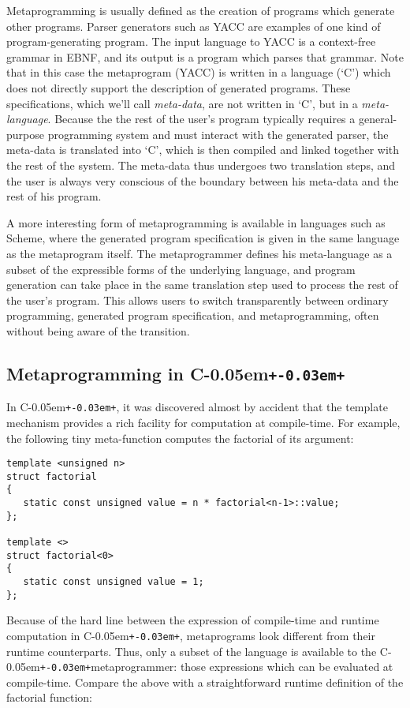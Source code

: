 \documentclass{netobjectdays}
\newcommand{\Cpp}{C\kern-0.05em\texttt{+\kern-0.03em+}}
\begin{document}
Metaprogramming is usually defined as the creation of programs which
generate other programs. Parser generators such as YACC are examples
of one kind of program-generating program. The input language to YACC
is a context-free grammar in EBNF, and its output is a program which
parses that grammar. Note that in this case the metaprogram (YACC) is
written in a language (`C') which does not directly support the
description of generated programs. These specifications, which we'll
call \emph{meta-data}, are not written in `C', but in a
\emph{meta-language}. Because the the rest of the user's program
typically requires a general-purpose programming system and must
interact with the generated parser, the meta-data is translated into
`C', which is then compiled and linked together with the rest of the
system. The meta-data thus undergoes two translation steps, and the
user is always very conscious of the boundary between his meta-data
and the rest of his program.

A more interesting form of metaprogramming is available in languages
such as Scheme, where the generated program specification is given in
the same language as the metaprogram itself. The metaprogrammer
defines his meta-language as a subset of the expressible forms of the
underlying language, and program generation can take place in the same
translation step used to process the rest of the user's program. This
allows users to switch transparently between ordinary programming,
generated program specification, and metaprogramming, often without
being aware of the transition.

\subsection{Metaprogramming in \Cpp }

In \Cpp, it was discovered almost by accident that the template
mechanism provides a rich facility for computation at
compile-time. For example, the following tiny meta-function computes the
factorial of its argument:

{\footnotesize
\begin{verbatim}
template <unsigned n>
struct factorial
{
   static const unsigned value = n * factorial<n-1>::value;
};

template <>
struct factorial<0>
{
   static const unsigned value = 1;
};
\end{verbatim}
}

Because of the hard line between the expression of compile-time and
runtime computation in \Cpp, metaprograms look different from their
runtime counterparts. Thus, only a subset of the language is available
to the \Cpp metaprogrammer: those expressions which can be evaluated
at compile-time. Compare the above with a straightforward runtime
definition of the factorial function:
\end{document}
